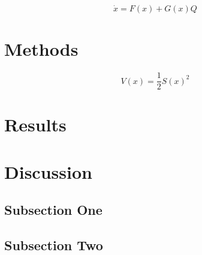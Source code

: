 \documentclass[twoside,twocolumn]{article}
\begin{document}
\begin{equation}
\dot{x} = F(x) + G(x)Q
\end{equation}



\section{Methods}

\begin{equation}
V(x) = \frac{1}{2}S(x)^{2}
\end{equation}


\section{Results}


\section{Discussion}

\subsection{Subsection One}

\subsection{Subsection Two}


\end{document}
